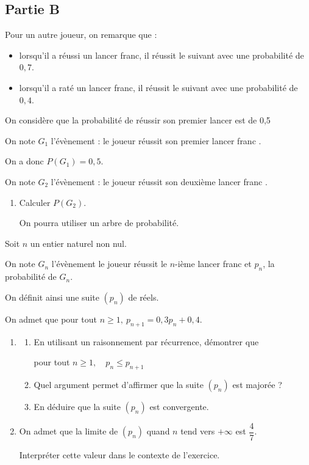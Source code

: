\subsection*{Partie B}

Pour un autre joueur, on remarque que :
\begin{itemize}
	\item lorsqu'il a réussi un lancer franc, il réussit le suivant avec une probabilité de $0,7$.
	\item lorsqu'il a raté un lancer franc, il réussit le suivant avec une probabilité de $0,4$.
\end{itemize}

On considère que la probabilité de réussir son premier lancer est de  0,5

On note $G_1$ l'évènement : \og le joueur réussit son premier lancer franc \fg.

On a donc $P(G_1) = 0,5$.

On note $G_2$ l'évènement : \og le joueur réussit son deuxième lancer franc \fg .

\medskip

\begin{enumerate}
	\item Calculer $P(G_2)$.

	On pourra utiliser un arbre de probabilité.
\end{enumerate}

Soit $n$ un entier naturel non nul.

On note $G_n$ l'évènement \og le joueur réussit le $n$-ième lancer franc \fg{} et $p_n$, la
probabilité de $G_n$.

On définit ainsi une suite $(p_n)$ de réels.

On admet que pour tout $n \geqslant 1,\: p_{n+1} = 0,3p_n + 0,4$.
\begin{enumerate}[resume]
	\item
	\begin{enumerate}
		\item En utilisant un raisonnement par récurrence, démontrer que

		\begin{center}pour tout $n \geqslant 1,\quad p_n \leqslant p_{n+1}$ \end{center}

		\item Quel argument permet d'affirmer que la suite $(p_n)$ est majorée ?
		\item En déduire que la suite $(p_n)$ est convergente.
	\end{enumerate}
	\item On admet que la limite de $(p_n)$ quand $n$ tend vers $+\infty$ est $\dfrac47$.

	Interpréter cette valeur dans le contexte de l'exercice.
\end{enumerate}
